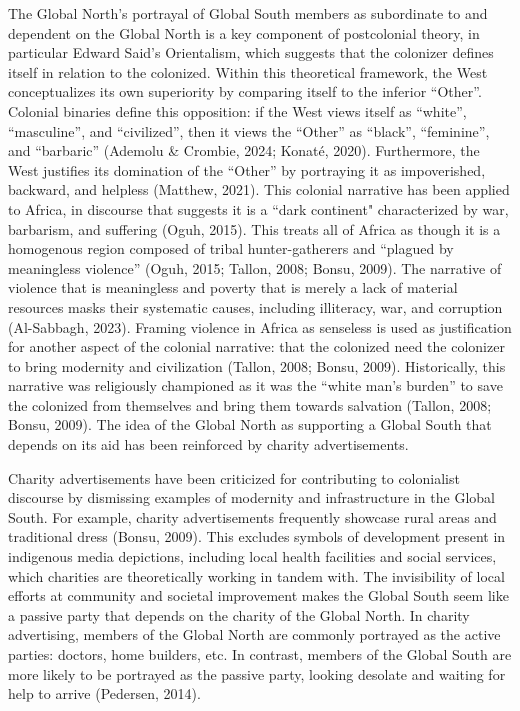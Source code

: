 The Global North’s portrayal of Global South members as subordinate to and dependent on the Global North is a key component of postcolonial theory, in particular Edward Said’s Orientalism, which suggests that the colonizer defines itself in relation to the colonized. Within this theoretical framework, the West conceptualizes its own superiority by comparing itself to the inferior “Other”. Colonial binaries define this opposition: if the West views itself as “white”, “masculine”, and “civilized”, then it views the “Other” as “black”, “feminine”, and “barbaric” (Ademolu \& Crombie, 2024; Konaté, 2020). Furthermore, the West justifies its domination of the “Other” by portraying it as impoverished, backward, and helpless (Matthew, 2021). This colonial narrative has been applied to Africa, in discourse that suggests it is a “dark continent" characterized by war, barbarism, and suffering (Oguh, 2015). This treats all of Africa as though it is a homogenous region composed of tribal hunter-gatherers and “plagued by meaningless violence”  (Oguh, 2015; Tallon, 2008; Bonsu, 2009). The narrative of violence that is meaningless and poverty that is merely a lack of material resources masks their systematic causes, including illiteracy, war, and corruption (Al-Sabbagh, 2023). Framing violence in Africa as senseless is used as justification for another aspect of the colonial narrative: that the colonized need the colonizer to bring modernity and civilization (Tallon, 2008; Bonsu, 2009). Historically, this narrative was religiously championed as it was the “white man’s burden” to save the colonized from themselves and bring them towards salvation (Tallon, 2008; Bonsu, 2009). The idea of the Global North as supporting a Global South that depends on its aid has been reinforced by charity advertisements.

Charity advertisements have been criticized for contributing to colonialist discourse by dismissing examples of modernity and infrastructure in the Global South. For example, charity advertisements frequently showcase rural areas and traditional dress (Bonsu, 2009). This excludes symbols of development present in indigenous media depictions, including local health facilities and social services, which charities are theoretically working in tandem with. The invisibility of local efforts at community and societal improvement makes the Global South seem like a passive party that depends on the charity of the Global North. In charity advertising, members of the Global North are commonly portrayed as the active parties: doctors, home builders, etc. In contrast, members of the Global South are more likely to be portrayed as the passive party, looking desolate and waiting for help to arrive (Pedersen, 2014). 

